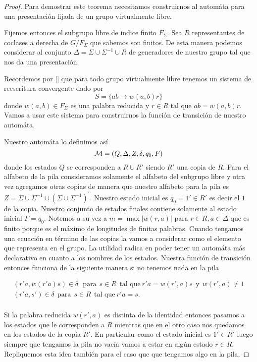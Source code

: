 \documentclass[tesis.tex]{subfiles}
\begin{document}
\begin{proof}
	Para demostrar este teorema necesitamos construirnos al automáta para una presentación fijada de un grupo virtualmente libre.
	
	Fijemos entonces el subgrupo libre de índice finito $F_\Sigma$. 
	Sea $R$ representantes de coclases a derecha de $G/F_\Sigma$ que sabemos son finitos. 
	De esta manera podemos considerar al conjunto  $\Delta = \Sigma \cup \Sigma^{-1} \cup R$ de generadores de nuestro grupo tal que nos da una presentación.
	
	Recordemos por \ref{} que para todo grupo virtualmente libre tenemos un sistema de reescritura convergente dado por 
	\[
	S = \{ ab \to w(a,b)r  \}
	\] 
	donde $w(a,b) \in F_\Sigma$ es una palabra reducida y $r \in R$ tal que $ab = w(a,b)r$. Vamos a usar este sistema para construirnos la función de transición de nuestro automáta. 
	
	Nuestro automáta lo definimos así 
	\[
	{\cal M }= (Q,\Delta, Z, \delta, q_0, F)
	\]
	donde los estados $Q$ se corresponden a $R \cup R'$ siendo $R'$ una copia de $R$. 
	Para el alfabeto de la pila consideramos solamente el alfabeto del subgrupo libre y otra vez agregamos otras copias de manera que nuestro alfabeto para la pila es $Z = \Sigma \cup \Sigma^{-1} \cup (\Sigma \cup \Sigma^{-1})^{'}$. 
	Nuestro estado inicial es $q_0 = 1' \in R'$ es decir el $1$ de la copia. Nuestro conjunto de estados finales contiene solamente al estado inicial $F=q_0$. 
	Notemos a su vez a $m = \max {|w(r,a)|}$ para $r \in R, a \in \Delta$ que es finito porque es el máximo de longitudes de finitas palabras. 
	Cuando tengamos una ecuación en término de las copias la vamos a considerar como el elemento que representa en el grupo. 
	La utilidad radica en poder tener un automáta más declarativo en cuanto a los nombres de los estados. 
	Nuestra función de transición entonces funciona de la siguiente manera si no tenemos nada en la pila
	
	\begin{align*}
		(r'a,w(r'a)s) \in \delta  \ \ \ \text{para} \ \  s \in R \ \ \text{tal que} \ r'a=w(r',a)s \ \ \text{y} \ \ w(r',a) \neq 1  \\
		(r'a,s') \in \delta  \ \ \text{para} \ \  s \in R \ \ \text{tal que} \ r'a=s.  \\ 
	\end{align*}
	
Si la palabra reducida $w(r',a)$ es distinta de la identidad entonces pasamos a los estados que le corresponden a $R$ mientras que en el otro caso nos quedamos en los estados de la copia $R'$. 
En particular como el estado inicial es $1' \in R'$ luego siempre que tengamos la pila no vacía vamos a estar en algún estado $r \in R$. 
Repliquemos esta idea también para el caso que que tengamos algo en la pila,
	

\end{proof}
\end{document}
